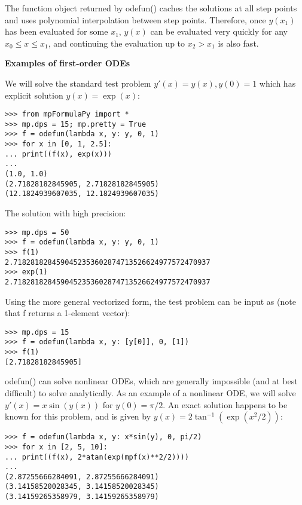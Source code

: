\vpara
The function object returned by odefun() caches the solutions at all step points and uses polynomial interpolation between step points. Therefore, once $y(x_1)$ has been evaluated for some $x_1$, $y(x)$ can be evaluated very quickly for any $x_0 \leq x \leq x_1$, and continuing the evaluation up to $x_2>x_1$ is also fast.

\vpara
\textbf{Examples of first-order ODEs}

We will solve the standard test problem $y'(x) = y(x), y(0)=1$ which has explicit solution $y(x)=\exp(x)$:

\begin{lstlisting}
>>> from mpFormulaPy import *
>>> mp.dps = 15; mp.pretty = True
>>> f = odefun(lambda x, y: y, 0, 1)
>>> for x in [0, 1, 2.5]:
... print((f(x), exp(x)))
...
(1.0, 1.0)
(2.71828182845905, 2.71828182845905)
(12.1824939607035, 12.1824939607035)
\end{lstlisting}

The solution with high precision:

\begin{lstlisting}
>>> mp.dps = 50
>>> f = odefun(lambda x, y: y, 0, 1)
>>> f(1)
2.7182818284590452353602874713526624977572470937
>>> exp(1)
2.7182818284590452353602874713526624977572470937
\end{lstlisting}

Using the more general vectorized form, the test problem can be input as (note that f returns a 1-element vector):

\begin{lstlisting}
>>> mp.dps = 15
>>> f = odefun(lambda x, y: [y[0]], 0, [1])
>>> f(1)
[2.71828182845905]
\end{lstlisting}

odefun() can solve nonlinear ODEs, which are generally impossible (and at best difficult) to solve analytically. As an example of a nonlinear ODE, we will solve $y'(x)=x \sin(y(x))$ for $y(0)=\pi/2$. An exact solution happens to be known for this problem, and is given by $y(x)=2 \tan^{-1}(\exp(x^2/2))$:

\begin{lstlisting}
>>> f = odefun(lambda x, y: x*sin(y), 0, pi/2)
>>> for x in [2, 5, 10]:
... print((f(x), 2*atan(exp(mpf(x)**2/2))))
...
(2.87255666284091, 2.87255666284091)
(3.14158520028345, 3.14158520028345)
(3.14159265358979, 3.14159265358979)
\end{lstlisting}

